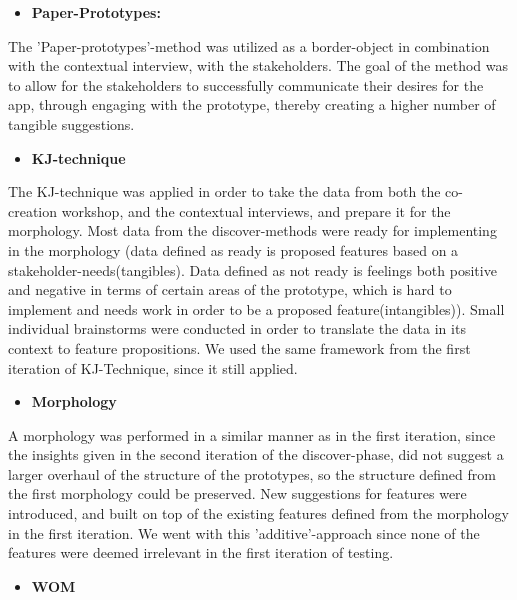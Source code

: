 \newpage
\begin{itemize}
    \item \bf{Paper-Prototypes:}
\end{itemize}

The 'Paper-prototypes'-method was utilized as a border-object in combination with the contextual interview, with the stakeholders. The goal of the method was to allow for the stakeholders to successfully communicate their desires for the app, through engaging with the prototype, thereby creating a higher number of tangible suggestions.

\begin{itemize}
    \item \bf{KJ-technique}
\end{itemize}

The KJ-technique was applied in order to take the data from both the co-creation workshop, and the contextual interviews, and prepare it for the morphology. Most data from the discover-methods were ready for implementing in the morphology (data defined as ready is proposed features based on a stakeholder-needs(tangibles). Data defined as not ready is feelings both positive and negative in terms of certain areas of the prototype, which is hard to implement and needs work in order to be a proposed feature(intangibles)). Small individual brainstorms were conducted in order to translate the data in its context to feature propositions. We used the same framework from the first iteration of KJ-Technique, since it still applied.

\begin{itemize}
    \item \bf{Morphology}
\end{itemize}

A morphology was performed in a similar manner as in the first iteration, since the insights given in the second iteration of the discover-phase, did not suggest a larger overhaul of the structure of the prototypes, so the structure defined from the first morphology could be preserved. New suggestions for features were introduced, and built on top of the existing features defined from the morphology in the first iteration. We went with this 'additive'-approach since none of the features were deemed irrelevant in the first iteration of testing.

\begin{itemize}
    \item \bf{WOM}
\end{itemize}

